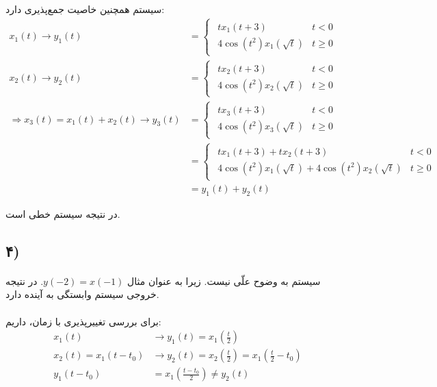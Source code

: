 \documentclass{article}
\begin{document}
	سیستم همچنین خاصیت جمع‌پذیری دارد:
	\begin{align*}
		x_1(t) \rightarrow y_1(t) &=
		\begin{cases}
			\begin{matrix}
				tx_1(t+3) & t < 0 \\
				4\cos(t^2)x_1(\sqrt t) & t \ge 0
			\end{matrix}
		\end{cases} \\
		x_2(t) \rightarrow y_2(t) &=
		\begin{cases}
			\begin{matrix}
				tx_2(t+3) & t < 0 \\
				4\cos(t^2)x_2(\sqrt t) & t \ge 0
			\end{matrix}
		\end{cases} \\
		\Rightarrow
		x_3(t) = x_1(t) + x_2(t) \rightarrow y_3(t) &=
		\begin{cases}
			\begin{matrix}
				tx_3(t+3) & t < 0 \\
				4\cos(t^2)x_3(\sqrt t) & t \ge 0
			\end{matrix}
		\end{cases} \\
		&=
		\begin{cases}
			\begin{matrix}
				tx_1(t+3) + tx_2(t+3) & t < 0 \\
				4\cos(t^2)x_1(\sqrt t) + 4\cos(t^2)x_2(\sqrt t) & t \ge 0
			\end{matrix}
		\end{cases} \\
		&= y_1(t) + y_2(t)
	\end{align*}

	در نتیجه سیستم خطی است.

	\subsection*{۴)}
	\paragraph*{}
	سیستم به وضوح علّی نیست. زیرا به عنوان مثال
	$y(-2) = x(-1)$.
	در نتیجه خروجی سیستم وابستگی به آینده دارد.


	\paragraph*{}
	برای بررسی تغییرپذیری با زمان، داریم:
	\begin{align*}
		x_1(t) &\rightarrow y_1(t) = x_1(\frac{t}{2}) \\
		x_2(t) = x_1(t - t_0) &\rightarrow y_2(t) = x_2(\frac{t}{2}) = x_1(\frac{t}{2} - t_0) \\
		y_1(t-t_0) &= x_1(\frac{t - t_0}{2}) \ne y_2(t)
	\end{align*}
\end{document}
